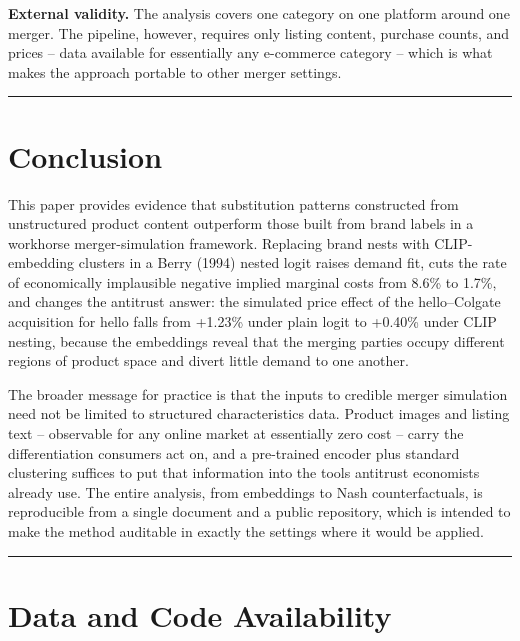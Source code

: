 \textbf{External validity.} The analysis covers one category on one
platform around one merger. The pipeline, however, requires only listing
content, purchase counts, and prices -- data available for essentially
any e-commerce category -- which is what makes the approach portable to
other merger settings.

\begin{center}\rule{0.5\linewidth}{0.5pt}\end{center}

\chapter{Conclusion}\label{conclusion}

This paper provides evidence that substitution patterns constructed from
unstructured product content outperform those built from brand labels in
a workhorse merger-simulation framework. Replacing brand nests with
CLIP-embedding clusters in a Berry (1994) nested logit raises demand
fit, cuts the rate of economically implausible negative implied marginal
costs from 8.6\% to 1.7\%, and changes the antitrust answer: the
simulated price effect of the hello--Colgate acquisition for hello falls
from +1.23\% under plain logit to +0.40\% under CLIP nesting, because
the embeddings reveal that the merging parties occupy different regions
of product space and divert little demand to one another.

The broader message for practice is that the inputs to credible merger
simulation need not be limited to structured characteristics data.
Product images and listing text -- observable for any online market at
essentially zero cost -- carry the differentiation consumers act on, and
a pre-trained encoder plus standard clustering suffices to put that
information into the tools antitrust economists already use. The entire
analysis, from embeddings to Nash counterfactuals, is reproducible from
a single document and a public repository, which is intended to make the
method auditable in exactly the settings where it would be applied.

\begin{center}\rule{0.5\linewidth}{0.5pt}\end{center}

\chapter*{Data and Code Availability}\label{data-and-code-availability}

